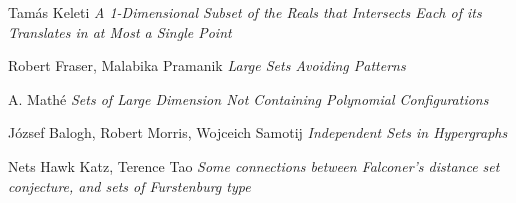 \documentclass[usenames,dvipsnames]{article}
\theoremstyle{plain}
\theoremstyle{plain}
\begin{document}
\begin{thebibliography}{9}


Tam\'{a}s Keleti
\textit{A 1-Dimensional Subset of the Reals that Intersects Each of its Translates in at Most a Single Point}

Robert Fraser, Malabika Pramanik
\textit{Large Sets Avoiding Patterns}

A. Math\'{e}
\textit{Sets of Large Dimension Not Containing Polynomial Configurations}

J\'{o}zsef Balogh, Robert Morris, Wojceich Samotij
\textit{Independent Sets in Hypergraphs}




Nets Hawk Katz, Terence Tao
\textit{Some connections between Falconer's distance set conjecture, and sets of Furstenburg type}

\end{thebibliography}

\end{document}
